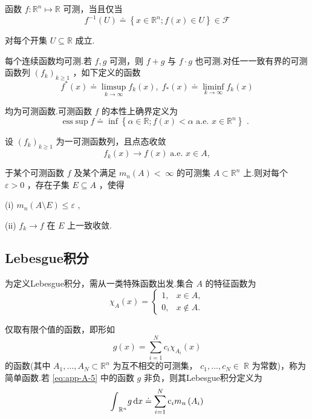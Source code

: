 函数 $f : {\mathbb{R}}^{n} \mapsto  \mathbb{R}$ 可测，当且仅当
\[
{f}^{-1}\left( U\right)  \doteq  \left\{  {x \in  {\mathbb{R}}^{n};f\left( x\right)  \in  U}\right\}   \in  \mathcal{F}
\]

对每个开集 $U \subseteq  \mathbb{R}$ 成立.

每个连续函数均可测.若 $f,g$ 可测，则 $f + g$ 与 $f \cdot  g$ 也可测.对任一一致有界的可测函数列 ${\left( {f}_{k}\right) }_{k \geq  1}$ ，如下定义的函数
\[
{f}^{ * }\left( x\right)  \doteq  \limsup_{{k \rightarrow  \infty }}{f}_{k}\left( x\right) ,\;{f}_{ * }\left( x\right)  \doteq  \mathop{\liminf }\limits_{{k \rightarrow  \infty }}{f}_{k}\left( x\right)
\]

均为可测函数.可测函数 $f$ 的本性上确界定义为
\[
\mathrm{ess}\sup f \doteq  \inf \left\{  {\alpha  \in  \mathbb{R};f\left( x\right)  < \alpha \text{ a.e. }x \in  {\mathbb{R}}^{n}}\right\}  \text{ . }
\]

\begin{theorem}[Egoroff]\label{thm:app-A-7}
设 ${\left( {f}_{k}\right) }_{k \geq  1}$ 为一可测函数列，且点态收敛
\[
{f}_{k}\left( x\right)  \rightarrow  f\left( x\right) \;\text{a.e. }x \in  A,
\]

于某个可测函数 $f$ 及某个满足 ${m}_{n}\left( A\right)  < \; \infty$ 的可测集 $A \subset  {\mathbb{R}}^{n}$ 上.则对每个 $\varepsilon  > 0$ ，存在子集 $E \subseteq  A$ ，使得

(i) ${m}_{n}\left( {A \setminus  E}\right)  \leq  \varepsilon$ ,

(ii) ${f}_{k} \rightarrow  f$ 在 $E$ 上一致收敛.
\end{theorem}

\subsection{Lebesgue积分}
为定义Lebesgue积分，需从一类特殊函数出发.集合 $A$ 的特征函数为
\[
{\chi }_{A}\left( x\right)  = \begin{cases} 1, &x \in  A, \\  0 , &x \notin  A. \end{cases}
\]

仅取有限个值的函数，即形如
\begin{equation}\tag{A.5}\label{eq:app-A-5}
g\left( x\right)  = \sum_{{i = 1}}^{N}{c}_{i}{\chi }_{{A}_{i}}\left( x\right)
\end{equation}
的函数(其中 ${A}_{1},\ldots ,{A}_{N} \subset  {\mathbb{R}}^{n}$ 为互不相交的可测集， ${c}_{1},\ldots ,{c}_{N} \in \; \mathbb{R}$ 为常数)，称为简单函数.若 \eqref{eq:app-A-5} 中的函数 $g$ 非负，则其Lebesgue积分定义为
\[
{\int }_{{\mathbb{R}}^{n}}{g\mathop{}\!\mathrm{d} x} \doteq  \sum_{{i = 1}}^{N}{\mathrm{c}}_{i}{m}_{n}\left( {A}_{i}\right)
\]

